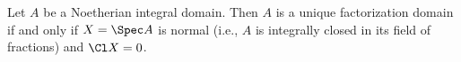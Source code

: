 Let $A$ be a Noetherian integral domain. Then $A$ is a unique factorization domain
if and only if $X = \Spec A$ is normal (i.e., $A$ is integrally closed in its field
of fractions) and $\Cl X = 0$.
